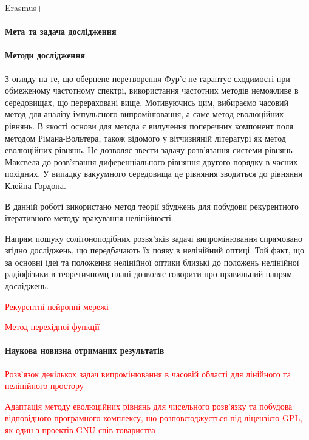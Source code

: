 Erasmus+

\paragraph{Мета та задача дослідження}

\paragraph{Методи дослідження}

З огляду на те, що обернене перетворення Фур'є не гарантує сходимості при 
обмеженому частотному спектрі, використання частотних методів неможливе в 
середовищах, що перераховані вище. Мотивуючись цим, вибираємо часовий метод 
для аналізу імпульсного випромінювання, а саме метод еволюційних рівнянь.
В якості основи для метода є вилучення поперечних компонент поля методом 
Рімана-Вольтера, також відомого у вітчизняній літературі як метод еволюційних 
рівнянь. Це дозволяє звести задачу розв'язання системи рівнянь Максвела до 
розв'язання диференціального рівняння другого порядку в часних похідних.
У випадку вакуумного середовища це рівняння зводиться до рівняння 
Клейна-Гордона.

В данній роботі використано метод теорії збуджень для побудови рекурентного
ітеративного методу врахування нелінійності.

Напрям пошуку солітоноподібних розвя'зків задачі випромінювання спрямовано 
згідно досліджень, що передбачають їх появу в нелінійний оптиці. Той факт,
що за основні ідеї та положення нелінійної оптики близькі до положень 
нелінійної радіофізики в теоретичномц плані дозволяє говорити про правильний 
напрям досліджень.

\textcolor{red}{Рекурентні нейронні мережі}

\textcolor{red}{Метод перехідної функції}

\paragraph{Наукова новизна отриманих результатів}

\textcolor{red}{Розв'язок декількох задач випромінювання в часовій області для 
лінійного та нелінійного простору}

\textcolor{red}{Адаптація методу еволюційних рівнянь для чисельного розв'язку
та побудова відповідного програмного комплексу, що розповсюджується під 
ліцензією GPL, як один з проектів GNU спів-товариства}

